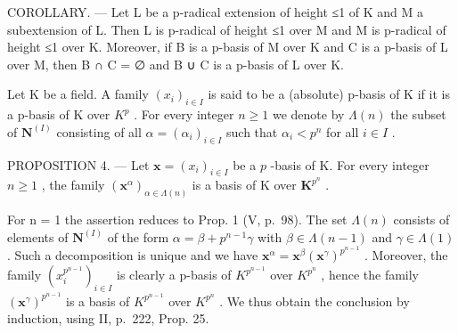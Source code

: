 COROLLARY. --- Let L be a p-radical extension of height ≤1 of K and M a subextension of L. Then L is p-radical of height ≤1 over M and M is p-radical of height ≤1 over K. Moreover, if B is a p-basis of M over K and C is a p-basis of L over M, then B ∩ C = ∅ and B ∪ C is a p-basis of L over K.

Let K be a field. A family \((x_{i})_{i\in I}\) is said to be a (absolute) p-basis of K if it is a p-basis of K over \(K^{p}\) . For every integer \(n\geqslant1\) we denote by \(\Lambda(n)\) the subset of \(\mathbf{N}^{(I)}\) consisting of all \(\alpha=(\alpha_{i})_{i\in I}\) such that \(\alpha_{i}<p^{n}\) for all \(i\in I\) .

PROPOSITION 4. --- Let \(\mathbf{x} = (x_i)_{i \in I}\) be a \(p\) -basis of K. For every integer \(n \geqslant 1\) , the family \((\mathbf{x}^\alpha)_{\alpha \in \Lambda(n)}\) is a basis of K over \(\mathbf{K}^{p^n}\) .

For n = 1 the assertion reduces to Prop. 1 (V, p.~98). The set \(\Lambda(n)\) consists of elements of \(\mathbf{N}^{(I)}\) of the form \(\alpha = \beta + p^{n-1}\gamma\) with \(\beta \in \Lambda(n-1)\) and \(\gamma \in \Lambda(1)\) . Such a decomposition is unique and we have \(\mathbf{x}^{\alpha} = \mathbf{x}^{\beta}(\mathbf{x}^{\gamma})^{p^{n-1}}\) . Moreover, the family \((x_{i}^{p^{n-1}})_{i \in I}\) is clearly a p-basis of \(K^{p^{n-1}}\) over \(K^{p^n}\) , hence the family \((\mathbf{x}^{\gamma})^{p^{n-1}}\) is a basis of \(K^{p^{n-1}}\) over \(K^{p^n}\) . We thus obtain the conclusion by induction, using II, p.~222, Prop. 25.

